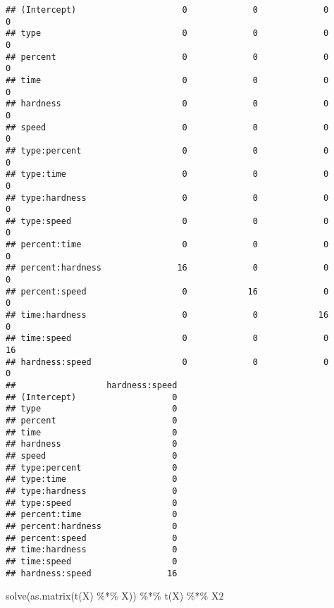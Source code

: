 \documentclass[
]{article}
\newenvironment{Shaded}{\begin{snugshade}}{\end{snugshade}}
\newcommand{\FunctionTok}[1]{\textcolor[rgb]{0.00,0.00,0.00}{#1}}
\newcommand{\NormalTok}[1]{#1}
\newcommand{\SpecialCharTok}[1]{\textcolor[rgb]{0.00,0.00,0.00}{#1}}
\begin{document}
\begin{verbatim}
## (Intercept)                     0             0             0          0
## type                            0             0             0          0
## percent                         0             0             0          0
## time                            0             0             0          0
## hardness                        0             0             0          0
## speed                           0             0             0          0
## type:percent                    0             0             0          0
## type:time                       0             0             0          0
## type:hardness                   0             0             0          0
## type:speed                      0             0             0          0
## percent:time                    0             0             0          0
## percent:hardness               16             0             0          0
## percent:speed                   0            16             0          0
## time:hardness                   0             0            16          0
## time:speed                      0             0             0         16
## hardness:speed                  0             0             0          0
##                  hardness:speed
## (Intercept)                   0
## type                          0
## percent                       0
## time                          0
## hardness                      0
## speed                         0
## type:percent                  0
## type:time                     0
## type:hardness                 0
## type:speed                    0
## percent:time                  0
## percent:hardness              0
## percent:speed                 0
## time:hardness                 0
## time:speed                    0
## hardness:speed               16
\end{verbatim}

\begin{Shaded}
\begin{Highlighting}[]
\FunctionTok{solve}\NormalTok{(}\FunctionTok{as.matrix}\NormalTok{(}\FunctionTok{t}\NormalTok{(X) }\SpecialCharTok{\%*\%}\NormalTok{ X)) }\SpecialCharTok{\%*\%} \FunctionTok{t}\NormalTok{(X) }\SpecialCharTok{\%*\%}\NormalTok{ X2}
\end{Highlighting}
\end{Shaded}
\end{document}
